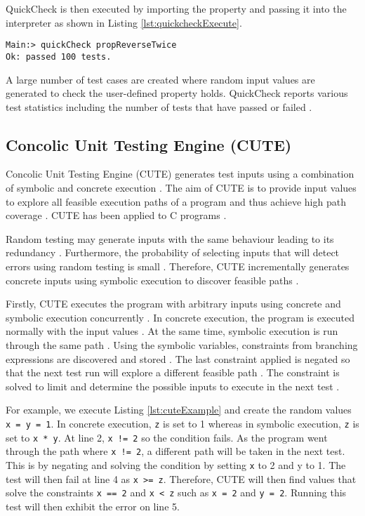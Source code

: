 QuickCheck is then executed by importing the property and passing it into the interpreter as shown in Listing \ref{lst:quickcheckExecute}.

\begin{lstlisting}[label={lst:quickcheckExecute}, caption={Executing tests to check a list is reversed}, captionpos=b,
frame = single]
Main:> quickCheck propReverseTwice
Ok: passed 100 tests.
\end{lstlisting}

A large number of test cases are created where random input values are generated to check the user-defined property holds. QuickCheck reports various test statistics including the number of tests that have passed or failed \cite{QClightweight}.

\subsection{Concolic Unit Testing Engine (CUTE)}
Concolic Unit Testing Engine (CUTE) generates test inputs using a combination of symbolic and concrete execution \cite{CUTE}. 
The aim of CUTE is to provide input values to explore all feasible execution paths of a program and thus achieve high path coverage \cite{CUTE}. CUTE has been applied to C programs \cite{CUTE}.

Random testing may generate inputs with the same behaviour leading to its redundancy \cite{CUTE}. Furthermore, the probability of selecting inputs that will detect errors using random testing is small \cite{CUTE}. 
Therefore, CUTE incrementally generates concrete inputs using symbolic execution to discover feasible paths \cite{CUTE}.

Firstly, CUTE executes the program with arbitrary inputs using concrete and symbolic execution concurrently \cite{CUTE}.
In concrete execution, the program is executed normally with the input values \cite{CUTE}.
At the same time, symbolic execution is run through the same path  \cite{CUTE}. 
Using the symbolic variables, constraints from branching expressions are discovered and stored \cite{CUTE}.
The last constraint applied is negated so that the next test run will explore a different feasible path \cite{CUTE}. 
The constraint is solved to limit and determine the possible inputs to execute in the next test \cite{CUTE}.

For example, we execute Listing \ref{lst:cuteExample} and create the random values \texttt{x = y = 1}. 
In concrete execution, \texttt{z} is set to 1 whereas in symbolic execution, \texttt{z} is set to \texttt{x * y}.
At line 2, \texttt{x != 2} so the condition fails. 
As the program went through the path where \texttt{x != 2}, a different path will be taken in the next test. This is by negating and solving the condition by setting \texttt{x} to 2 and y to 1. 
The test will then fail at line 4 as \texttt{x >= z}. Therefore, CUTE will then find values that solve the constraints \texttt{x == 2} and \texttt{x < z} such as \texttt{x = 2} and \texttt{y = 2}. 
Running this test will then exhibit the error on line 5. 


